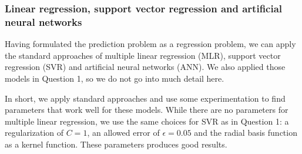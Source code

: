 \documentclass[11pt]{article}
\begin{document}






\subsubsection*{Linear regression, support vector regression and artificial neural networks}

Having formulated the prediction problem as a regression problem, we can apply the standard approaches of multiple linear regression (MLR), support vector regression (SVR) and artificial neural networks (ANN).
We also applied those models in Question 1, so we do not go into much detail here.

In short, we apply standard approaches and use some experimentation to find parameters that work well for these models.
While there are no parameters for multiple linear regression, we use the same choices for SVR as in Question 1: a regularization of $C = 1$, an allowed error of $\epsilon = 0.05$ and the radial basis function as a kernel function.
These parameters produces good results.
\end{document}
